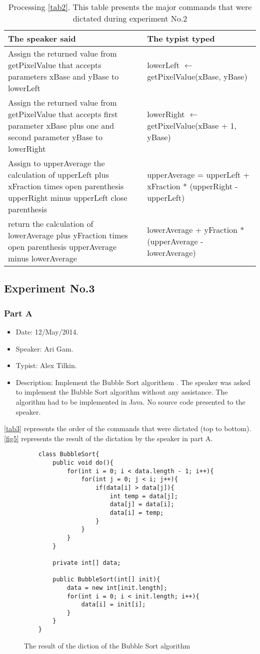 \begin{table}[H]
	\begin{tabular}{|p{10cm}|p{6cm}|}
		\hline
		\rowcolor[HTML]{9B9B9B} 
		{\color[HTML]{000000} The speaker said} & {\color[HTML]{000000} The typist typed} \\ \hline
		Assign the returned value from getPixelValue that accepts parameters xBase and yBase to lowerLeft & lowerLeft $\leftarrow$ getPixelValue(xBase, yBase) \\ \hline
		Assign the returned value from getPixelValue that accepts first parameter xBase plus one and second parameter yBase to lowerRight & lowerRight $\leftarrow$ getPixelValue(xBase + 1, yBase) \\ \hline
		Assign to upperAverage the calculation of upperLeft plus xFraction times open parenthesis upperRight minus upperLeft close parenthesis & upperAverage = upperLeft + xFraction * (upperRight - upperLeft) \\ \hline
		return the calculation of lowerAverage plus yFraction times open parenthesis upperAverage minus lowerAverage & lowerAverage + yFraction * (upperAverage - lowerAverage) \\ \hline
	\end{tabular}
	\caption{Processing \autoref{tab2}. This table presents the major commands that were dictated during experiment No.2}
	\label{tab8}
\end{table}
\subsection{Experiment No.3}
\subsubsection{Part A}
\begin{itemize}
	\item Date: 12/May/2014.
	\item Speaker: Ari Gam.
	\item Typist: Alex Tilkin.
	\item Description: Implement the Bubble Sort algorithem . The speaker was asked to implement the Bubble Sort algorithm without any assistance. The algorithm had to be implemented in Java. No source code presented to the speaker.
\end{itemize}
\autoref{tab3} represents the order of the commands that were dictated (top to bottom). \autoref{fig5} represents the result of the dictation by the speaker in part A.
\begin{figure}[H]
	\begin{lstlisting}
	class BubbleSort{
		public void do(){
			for(int i = 0; i < data.length - 1; i++){
				for(int j = 0; j < i; j++){
					if(data[i] > data[j]){
						int temp = data[j];
						data[j] = data[i];
						data[i] = temp;
					}
				}
			}
		}
		
		private int[] data;
		
		public BubbleSort(int[] init){
			data = new int[init.length];
			for(int i = 0; i < init.length; i++){
				data[i] = init[i];
			}
		}
	}
	\end{lstlisting}
	\caption{The result of the diction of the Bubble Sort algorithm}
	\label{fig5}
\end{figure}
